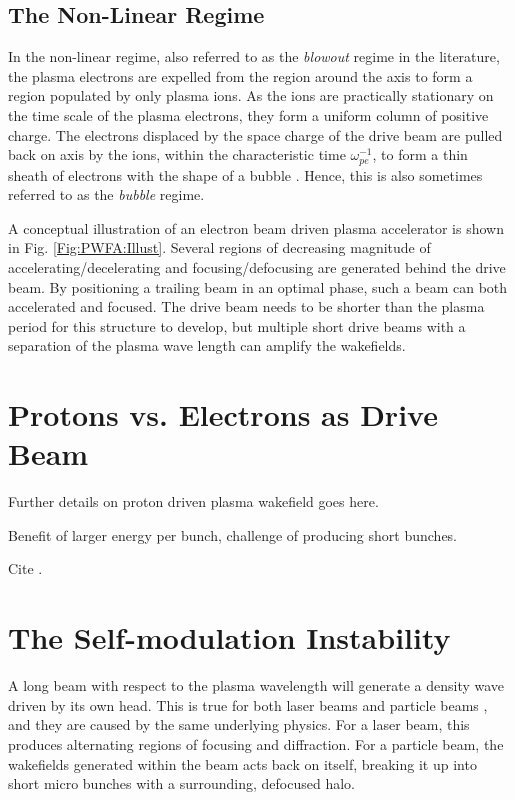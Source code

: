 \subsection{The Non-Linear Regime}
\label{Int:BPI:NLin}

In the non-linear regime, also referred to as the \textit{blowout} regime in the literature, the plasma electrons are expelled from the region around the axis to form a region populated by only plasma ions. As the ions are practically stationary on the time scale of the plasma electrons, they form a uniform column of positive charge. The electrons displaced by the space charge of the drive beam are pulled back on axis by the ions, within the characteristic time $\omega_{pe}^{-1}$, to form a thin sheath of electrons with the shape of a bubble \cite{lu:2006a,lu:2006}. Hence, this is also sometimes referred to as the \textit{bubble} regime.

A conceptual illustration of an electron beam driven plasma accelerator is shown in Fig. \ref{Fig:PWFA:Illust}. Several regions of decreasing magnitude of accelerating/decelerating and focusing/defocusing are generated behind the drive beam. By positioning a trailing beam in an optimal phase, such a beam can both accelerated and focused. The drive beam needs to be shorter than the plasma period for this structure to develop, but multiple short drive beams with a separation of the plasma wave length can amplify the wakefields.

\section{Protons vs. Electrons as Drive Beam}
\label{Int:PDPWFA}

Further details on proton driven plasma wakefield goes here.

Benefit of larger energy per bunch, challenge of producing short bunches.

Cite \cite{adli:2016a}.

\section{The Self-modulation Instability}
\label{Int:SMI}

A long beam with respect to the plasma wavelength will generate a density wave driven by its own head. This is true for both laser beams \cite{esarey:1994} and particle beams \cite{kumar:2010}, and they are caused by the same underlying physics. For a laser beam, this produces alternating regions of focusing and diffraction. For a particle beam, the wakefields generated within the beam acts back on itself, breaking it up into short micro bunches with a surrounding, defocused halo.

